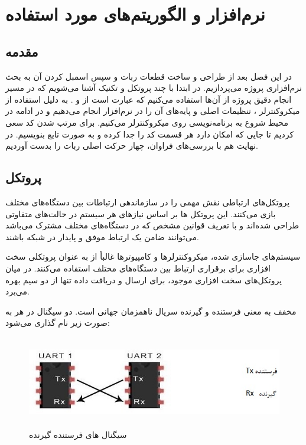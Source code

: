 \chapter{نرم‌افزار و الگوریتم‌های مورد استفاده}
\section{مقدمه}
در این فصل بعد از طراحی و ساخت قطعات ربات و سپس اسمبل کردن آن به بحث نرم‌افزاری پروژه می‌پردازیم. در ابتدا با چند پروتکل و تکنیک آشنا می‌شویم که در مسیر انجام دقیق پروژه از آن‌ها استفاده می‌کنیم که عبارت است از 
 و .
به دلیل استفاده از میکروکنترلر ، تنظیمات اصلی و پایه‌های آن را در نرم‌افزار   انجام می‌دهیم و در ادامه در محیط   شروع به برنامه‌نویسی روی میکروکنترلر می‌کنیم. برای مرتب شدن کد سعی کردیم تا جایی که امکان دارد هر قسمت کد را جدا کرده و به صورت تابع بنویسیم. در نهایت هم با بررسی‌های فراوان، چهار حرکت اصلی ربات را بدست آوردیم.
\section{پروتکل }
پروتکل‌های ارتباطی نقش مهمی را در سازماندهی ارتباطات بین دستگاه‌های مختلف بازی می‌کنند. این پروتکل ها بر اساس نیازهای هر سیستم در حالت‌های متفاوتی طراحی شده‌اند و با تعریف قوانین مشخص که در دستگاه‌های مختلف مشترک می‌باشد می‌توانند ضامن یک ارتباط موفق و پایدار در شبکه باشند.

سیستم‌های جاسازی شده، میکروکنترلرها و کامپیوترها غالباً از  به عنوان پروتکلی سخت افزاری برای برقراری ارتباط بین دستگاه‌های مختلف استفاده می‌کنند. در میان پروتکل‌های سخت افزاری موجود،  برای ارسال و دریافت داده تنها از دو سیم بهره می‌برد.

مخفف
به معنی فرستنده و گیرنده سریال ناهمزمان جهانی است. دو سیگنال در هر  به صورت زیر نام گذاری می‌شود:
    \begin{figure}[!h]
    \centering
	\includegraphics[height=4cm,width=15cm]{./Images/CH4/UART_1.jpg}
	\caption[سیگنال های فرستنده گیرنده ]{سیگنال های فرستنده گیرنده }
	\label{سیگنال فرستنده و گیرنده}
	\end{figure}
	

